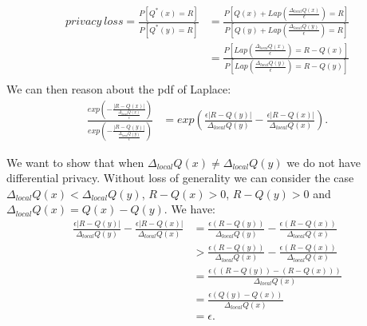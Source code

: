 \documentclass{article}
\begin{document}
\begin{equation*}
\begin{split}
privacy\ loss = \frac{P[Q^{*}(x) = R]}{P[Q^{*}(y) = R]}
& = \frac{P[Q(x) + Lap(\frac{\Delta_{local} Q(x)}{\epsilon}) = R]}{P[Q(y) + Lap(\frac{\Delta_{local} Q(y)}{\epsilon}) = R]}\\
& = \frac{P[Lap(\frac{\Delta_{local} Q(x)}{\epsilon}) = R - Q(x)]}{P[Lap(\frac{\Delta_{local} Q(y)}{\epsilon}) = R - Q(y)]}\\
\end{split}
\end{equation*}
We can then reason about the pdf of Laplace:
\begin{equation*}
\begin{split}
\frac{exp(-\frac{|R - Q(x)|}{\frac{\Delta_{local} Q(x)}{\epsilon}})}{exp(-\frac{|R - Q(y)|}{\frac{\Delta_{local} Q(y)}{\epsilon}})}
& = exp(\frac{\epsilon |R - Q(y)|}{\Delta_{local} Q(y)} - \frac{\epsilon |R - Q(x)|}{\Delta_{local} Q(x)}).
\end{split}
\end{equation*}

We want to show that when $\Delta_{local} Q(x) \neq \Delta_{local}
Q(y) $ we do not have differential privacy. Without loss of generality
we can consider the case $\Delta_{local} Q(x) < \Delta_{local}
Q(y)$, $R -Q(x)>0$, $R - Q(y)>0$ and $\Delta_{local} Q(x)=Q(x)-Q(y)$. We have:
\begin{equation*}
\begin{split}
\frac{\epsilon |R - Q(y)|}{\Delta_{local} Q(y)} - \frac{\epsilon |R - Q(x)|}{\Delta_{local} Q(x)}
& = \frac{\epsilon (R - Q(y))}{\Delta_{local} Q(y)} - \frac{\epsilon (R - Q(x))}{\Delta_{local} Q(x)}\\
& > \frac{\epsilon (R - Q(y))}{\Delta_{local} Q(x)} - \frac{\epsilon (R - Q(x))}{\Delta_{local} Q(x)} \\
& = \frac{\epsilon((R - Q(y)) - (R - Q(x)))}{\Delta_{local} Q(x)}\\
& = \frac{\epsilon(Q(y) - Q(x))}{\Delta_{local} Q(x)} \\
& = \epsilon.
\end{split}
\end{equation*}
\end{document}
